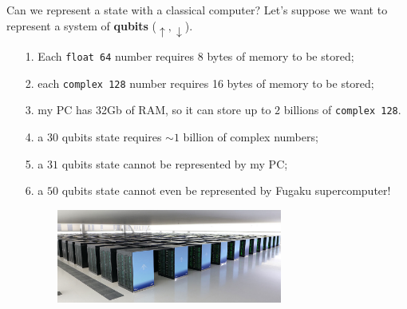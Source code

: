 \documentclass[8pt, xcolor={svgnames}, hyperref={linkcolor=amethyst}]{beamer}
\begin{document}
\begin{frame}{Can we represent a state with a classical computer?}
Let's suppose we want to represent a system of \textbf{qubits} ($\uparrow, \downarrow$).
\pause
\begin{itemize}[noitemsep]
\item[1.] Each \texttt{float 64} number requires 8 bytes of memory to be stored;
\pause
\item[2.] each \texttt{complex 128} number requires 16 bytes of memory to be stored;
\pause
\item[3.] my PC has 32Gb of RAM, so it can store up to $2$ billions of \texttt{complex 128}.
\pause
\item[4.] a $30$ qubits state requires $\sim 1$ billion of complex numbers;
\pause
\item[5.] a $31$ qubits state cannot be represented by my PC;
\pause
\item[6.] a $50$ qubits state cannot even be represented by Fugaku supercomputer!
\begin{figure}
   \includegraphics[width=0.7\textwidth, height=0.4\textheight]{figures/fugaku.jpg}%
\end{figure}
\end{itemize}
\end{frame}
\end{document}
